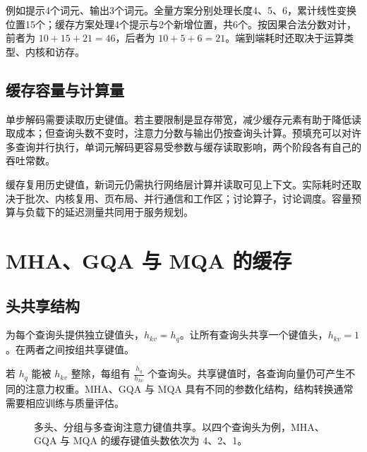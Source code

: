 \documentclass[../textbook.tex]{subfiles}
\begin{document}
例如提示4个词元、输出3个词元。全量方案分别处理长度4、5、6，累计线性变换位置15个；缓存方案处理4个提示与2个新增位置，共6个。按因果合法分数对计，前者为 $10+15+21=46$，后者为 $10+5+6=21$。端到端耗时还取决于运算类型、内核和访存。

\subsection{缓存容量与计算量}
单步解码需要读取历史键值。若主要限制是显存带宽，减少缓存元素有助于降低读取成本；但查询头数不变时，注意力分数与输出仍按查询头计算。预填充可以对许多查询并行执行，单词元解码更容易受参数与缓存读取影响，两个阶段各有自己的吞吐常数。

缓存复用历史键值，新词元仍需执行网络层计算并读取可见上下文。实际耗时还取决于批次、内核复用、页布局、并行通信和工作区；讨论算子，讨论调度。容量预算与负载下的延迟测量共同用于服务规划。

\section{MHA、GQA 与 MQA 的缓存}

\subsection{头共享结构}
为每个查询头提供独立键值头，$h_{kv}=h_q$。让所有查询头共享一个键值头，$h_{kv}=1$\cite{shazeer2019mqa}。在两者之间按组共享键值\cite{ainslie2023gqa}。

若 $h_q$ 能被 $h_{kv}$ 整除，每组有 $\frac{h_q}{h_{kv}}$ 个查询头。共享键值时，各查询向量仍可产生不同的注意力权重。MHA、GQA 与 MQA 具有不同的参数化结构，结构转换通常需要相应训练与质量评估。

\begin{figure}[htbp]
\centering
{}
\caption[多头、分组与多查询注意力键值共享]{多头、分组与多查询注意力键值共享。以四个查询头为例，MHA、GQA 与 MQA 的缓存键值头数依次为 4、2、1。}\label{fig:cache-heads}
\end{figure}
\end{document}
